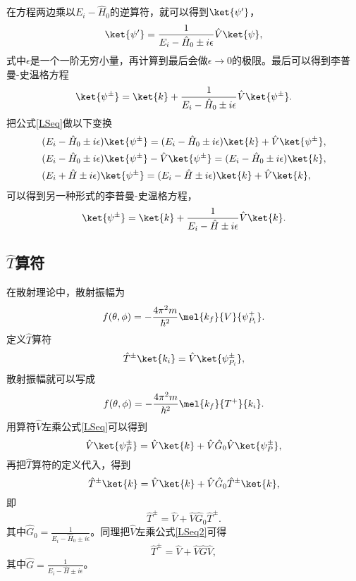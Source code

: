 在方程两边乘以$E_{i}-\hat{H}_{0}$的逆算符，就可以得到$\ket{\psi'}$，
\begin{equation}
\ket{\psi'}=\frac{1}{E_{i}-\hat{H}_{0}\pm i\epsilon}\hat{V}\ket{\psi},
\end{equation}
式中$\epsilon$是一个一阶无穷小量，再计算到最后会做$\epsilon\to 0$的极限。最后可以得到李普曼-史温格方程
\begin{equation}
\label{LSeq}
\ket{\psi^{\pm}}=\ket{k}+\frac{1}{E_{i}-\hat{H}_{0}\pm i\epsilon}\hat{V}\ket{\psi^{\pm}}.
\end{equation}
把公式\eqref{LSeq}做以下变换
\begin{equation}
\begin{split}
	&(E_{i}-\hat{H}_{0}\pm i\epsilon)\ket{\psi^{\pm}}=(E_{i}-\hat{H}_{0}\pm i\epsilon)\ket{k}+\hat{V}\ket{\psi^{\pm}},\\
	&(E_{i}-\hat{H}_{0}\pm i\epsilon)\ket{\psi^{\pm}}-\hat{V}\ket{\psi^{\pm}}=(E_{i}-\hat{H}_{0}\pm i\epsilon)\ket{k},\\
	&(E_{i}+\hat{H}\pm i\epsilon)\ket{\psi^{\pm}}=(E_{i}-\hat{H}\pm i\epsilon)\ket{k}+\hat{V}\ket{k},
\end{split}
\end{equation}
可以得到另一种形式的李普曼-史温格方程，
\begin{equation}
\label{LSeq2}
\ket{\psi^{\pm}}=\ket{k}+\frac{1}{E_{i}-\hat{H}\pm i\epsilon}\hat{V}\ket{k}.
\end{equation}
\subsection{$\hat{T}$算符}
在散射理论中，散射振幅为
\begin{equation}
	f(\theta,\phi)=%
	-\frac{4\pi^2m}{\hbar^2}\mel{k_{f}}{V}{\psi^{+}_{P_{i}}}.
\end{equation}
定义$\hat{T}$算符
\begin{equation}
\label{T operators def}
	\hat{T}^{\pm}\ket{k_{i}}=\hat{V}\ket{\psi^{\pm}_{P_{i}}},
\end{equation}
散射振幅就可以写成
\begin{equation}
	f(\theta,\phi)=-\frac{4\pi^2m}{\hbar^2}\mel{k_{f}}{T^{+}}{k_{i}}.
\end{equation}
用算符$\hat{V}$左乘公式\eqref{LSeq}可以得到
\begin{equation}
	\hat{V}\ket{\psi_P^{\pm}}=\hat{V}\ket{k}+\hat{V}\hat{G}_{0}\hat{V}\ket{\psi_P^{\pm}},
\end{equation}
再把$\hat{T}$算符的定义代入，得到
\begin{equation}
	\hat{T}^{\pm}\ket{k}=\hat{V}\ket{k}+\hat{V}\hat{G}_{0}\hat{T}^{\pm}\ket{k},
\end{equation}
即
\begin{equation}
	\hat{T}^{\pm}=\hat{V}+\hat{V}\hat{G}_{0}\hat{T}^{\pm}.
\end{equation}
其中$\hat{G}_{0}=\frac{1}{E_{i}-\hat{H}_{0}\pm i\epsilon}$。同理把$\hat{V}$左乘公式\eqref{LSeq2}可得
\begin{equation}
	\hat{T}^{\pm}=\hat{V}+\hat{V}\hat{G}\hat{V},
\end{equation}
其中$\hat{G}=\frac{1}{E_{i}-\hat{H}\pm i\epsilon}$。
